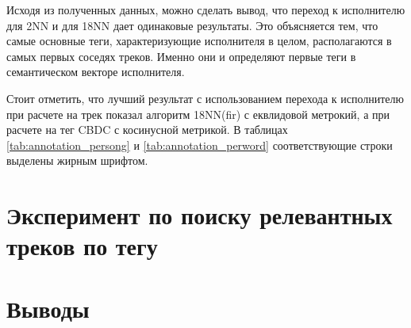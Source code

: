 Исходя из полученных данных, можно сделать вывод, что переход к исполнителю для 2NN и для 18NN дает одинаковые результаты. Это объясняется тем, что самые основные теги, характеризующие исполнителя в целом, 
располагаются в самых первых соседях треков. Именно они и определяют первые теги в семантическом векторе исполнителя.

Стоит отметить, что лучший результат с использованием перехода к исполнителю при расчете на трек показал алгоритм 18NN(fir) с еквлидовой метрокий, а при расчете на тег \ld CBDC с косинусной метрикой.
В таблицах \ref{tab:annotation_persong} и \ref{tab:annotation_perword} соответствующие строки выделены жирным шрифтом.

\section{Эксперимент по поиску релевантных треков по тегу}
\section{Выводы}
